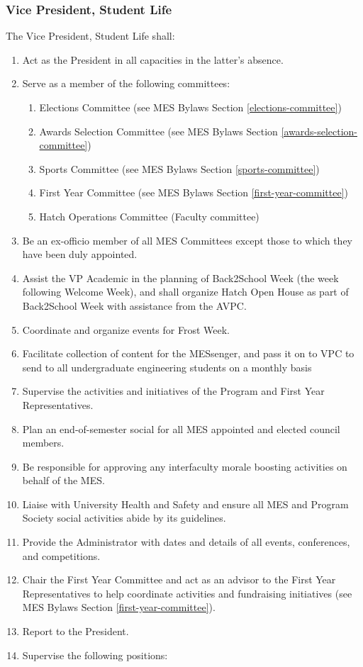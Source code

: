 \subsubsection{Vice President, Student
 Life}
\label{vice-president-student-life}
The Vice President, Student Life shall:

\begin{enumerate}
 \item
  Act as the President in all capacities in the latter's absence.
 \item
  Serve as a member of the following committees:

  \begin{enumerate}
   \item
    Elections Committee (see MES Bylaws Section \ref{elections-committee})
   \item
    Awards Selection Committee (see MES Bylaws Section \ref{awards-selection-committee})
   \item
    Sports Committee (see MES Bylaws Section \ref{sports-committee})
   \item
    First Year Committee (see MES Bylaws Section \ref{first-year-committee})
   \item
    Hatch Operations Committee (Faculty committee)
  \end{enumerate}
 \item
  Be an ex-officio member of all MES Committees except those to which they have been duly appointed.
 \item
  Assist the VP Academic in the planning of Back2School Week (the week following Welcome Week), and shall organize Hatch Open House as part of Back2School Week with assistance from the AVPC.
 \item
  Coordinate and organize events for Frost Week.
 \item
  Facilitate collection of content for the MESsenger, and pass it on to VPC to send to all undergraduate engineering students on a monthly basis
 \item
  Supervise the activities and initiatives of the Program and First Year Representatives.
 \item
  Plan an end-of-semester social for all MES appointed and elected council members.
 \item
  Be responsible for approving any interfaculty morale boosting activities on behalf of the MES.
 \item
  Liaise with University Health and Safety and ensure all MES and Program Society social activities abide by its guidelines.
 \item
  Provide the Administrator with dates and details of all events, conferences, and competitions.
 \item
  Chair the First Year Committee and act as an advisor to the First Year Representatives to help coordinate activities and fundraising initiatives (see MES Bylaws Section \ref{first-year-committee}).
 \item
  Report to the President.
 \item
  Supervise the following positions:


\end{enumerate}
